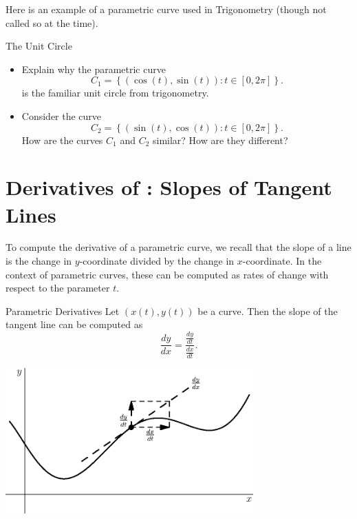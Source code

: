 Here is an example of a parametric curve used in Trigonometry (though not called so at the time).

\begin{exercise}{The Unit Circle \Coffeecup \Coffeecup}
\begin{itemize}
\item Explain why the parametric curve $$C_1=\left\{\left(\cos(t),\sin(t)\right): t\in [0,2\pi] \right\}.$$ is the familiar unit circle from trigonometry.
\vspace*{1in}
\item Consider the curve $$C_2=\left\{\left(\sin(t),\cos(t)\right): t\in [0,2\pi] \right\}.$$ How are the curves $C_1$ and $C_2$ similar?  How are they different?
\vspace*{1in}
\end{itemize} 
\end{exercise}

\section{Derivatives of : Slopes of Tangent Lines}

To compute the derivative of a parametric curve, we recall that the slope of a line is the change in $y$-coordinate divided by the change in $x$-coordinate.  In the context of parametric curves, these can be computed as rates of change with respect to the parameter $t$.

\begin{definition}{Parametric Derivatives}
Let $\left(x(t),y(t)\right)$ be a  curve.  Then the slope of the tangent line can be computed as $$\frac{dy}{dx}=\frac{\frac{dy}{dt}}{\frac{dx}{dt}}.$$ 

	\begin{center}
		\includegraphics[width=270pt]{ChapterCalcIII/Figures/paraslope.eps}
	\end{center}

\end{definition}

